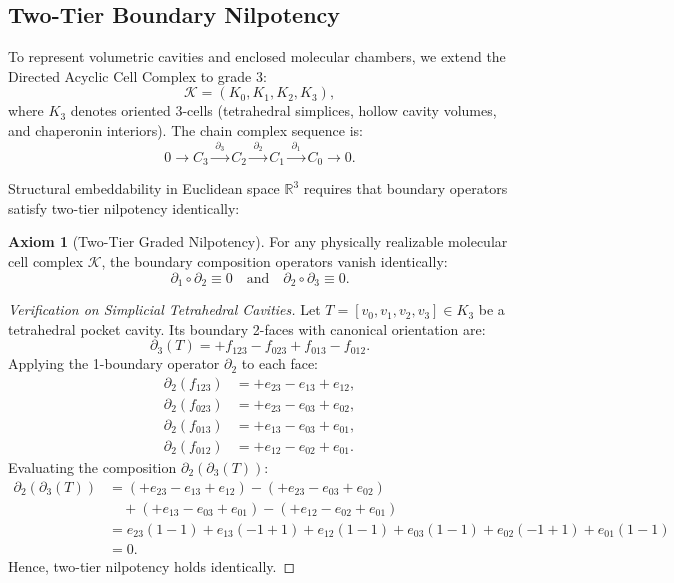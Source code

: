 \documentclass[11pt, a4paper]{article}
\theoremstyle{definition}
\newtheorem{axiom}{Axiom}[section]
\theoremstyle{plain}
\theoremstyle{remark}
\begin{document}
\subsection{Two-Tier Boundary Nilpotency}
To represent volumetric cavities and enclosed molecular chambers, we extend the Directed Acyclic Cell Complex to grade 3:
\begin{equation}
    \mathcal{K} = (K_0, K_1, K_2, K_3),
\end{equation}
where $K_3$ denotes oriented 3-cells (tetrahedral simplices, hollow cavity volumes, and chaperonin interiors). The chain complex sequence is:
\begin{equation}
    0 \xrightarrow{\quad} C_3 \xrightarrow{\;\partial_3\;} C_2 \xrightarrow{\;\partial_2\;} C_1 \xrightarrow{\;\partial_1\;} C_0 \xrightarrow{\quad} 0.
\end{equation}

Structural embeddability in Euclidean space $\mathbb{R}^3$ requires that boundary operators satisfy two-tier nilpotency identically:
\begin{axiom}[Two-Tier Graded Nilpotency]
\label{ax:two_tier_nilpotency}
For any physically realizable molecular cell complex $\mathcal{K}$, the boundary composition operators vanish identically:
\begin{equation}
    \partial_1 \circ \partial_2 \equiv 0 \quad \text{and} \quad \partial_2 \circ \partial_3 \equiv 0.
\end{equation}
\end{axiom}

\begin{proof}[Verification on Simplicial Tetrahedral Cavities]
Let $T = [v_0, v_1, v_2, v_3] \in K_3$ be a tetrahedral pocket cavity. Its boundary 2-faces with canonical orientation are:
\begin{equation}
    \partial_3(T) = +f_{123} - f_{023} + f_{013} - f_{012}.
\end{equation}
Applying the 1-boundary operator $\partial_2$ to each face:
\begin{align*}
    \partial_2(f_{123}) &= +e_{23} - e_{13} + e_{12}, \\
    \partial_2(f_{023}) &= +e_{23} - e_{03} + e_{02}, \\
    \partial_2(f_{013}) &= +e_{13} - e_{03} + e_{01}, \\
    \partial_2(f_{012}) &= +e_{12} - e_{02} + e_{01}.
\end{align*}
Evaluating the composition $\partial_2(\partial_3(T))$:
\begin{align*}
    \partial_2(\partial_3(T)) &= (+e_{23} - e_{13} + e_{12}) - (+e_{23} - e_{03} + e_{02}) \\
    &\quad + (+e_{13} - e_{03} + e_{01}) - (+e_{12} - e_{02} + e_{01}) \\
    &= e_{23}(1 - 1) + e_{13}(-1 + 1) + e_{12}(1 - 1) + e_{03}(1 - 1) + e_{02}(-1 + 1) + e_{01}(1 - 1) \\
    &= 0.
\end{align*}
Hence, two-tier nilpotency holds identically.
\end{proof}
\end{document}
